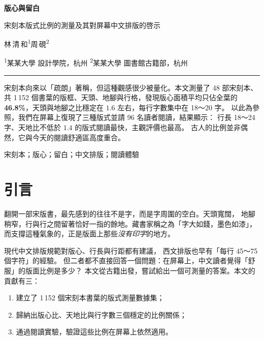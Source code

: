 \documentclass[UTF8,zihao=-4]{ctexart}
\begin{document}
\thispagestyle{empty}
\begin{center}
  {\bfseries 版心與留白\par}
  \vspace{6pt}
  {宋刻本版式比例的測量及其對屏幕中文排版的啓示\par}
  \vspace{14pt}
  {\kaishu 林\,清\,和\textsuperscript{1}\qquad 周\,硯\textsuperscript{2}\par}
  \vspace{4pt}
  {\small\color{mist}
    \textsuperscript{1}某某大學 設計學院，杭州\qquad
    \textsuperscript{2}某某大學 圖書館古籍部，杭州\par}
  \vspace{12pt}
  {\color{accent}\rule{2.5cm}{.6pt}}
\end{center}

\begin{center}
  \begin{minipage}{.9\linewidth}
    \small
    \quad
    宋刻本向來以「疏朗」著稱，但這種觀感很少被量化。本文測量了 48 部宋刻本、
    共 1\,152 個書葉的版框、天頭、地腳與行格，發現版心面積平均只佔全葉的
    \textbf{46.8\%}，天頭與地腳之比穩定在 $1.6$ 左右，每行字數集中在 18～20 字。
    以此為參照，我們在屏幕上復現了三種版式並請 96 名讀者閱讀，結果顯示：
    行長 18～24 字、天地比不低於 $1.4$ 的版式閱讀最快，主觀評價也最高。
    古人的比例並非偶然，它與今天的閱讀舒適區高度重合。

    \vspace{4pt}
    \quad 宋刻本；版心；留白；中文排版；閱讀體驗
  \end{minipage}
\end{center}
\vspace{8pt}

\section{引言}

翻開一部宋版書，最先感到的往往不是字，而是字周圍的空白。天頭寬闊，
地腳稍窄，行與行之間留著恰好一指的餘地。藏書家稱之為「字大如錢，墨色如漆」，
而支撐這種氣象的，正是版面上那些\emph{沒有印字}的地方。

現代中文排版規範對版心、行長與行距都有建議\cite{w3c2020clreq}，
西文排版也早有「每行 45～75 個字符」的經驗\cite{bringhurst2004}。
但二者都不直接回答一個問題：在屏幕上，中文讀者覺得「舒服」的版面比例是多少？
本文從古籍出發，嘗試給出一個可測量的答案。本文的貢獻有三：
\begin{enumerate}
  \item 建立了 1\,152 個宋刻本書葉的版式測量數據集；
  \item 歸納出版心比、天地比與行字數三個穩定的比例關係；
  \item 通過閱讀實驗，驗證這些比例在屏幕上依然適用。
\end{enumerate}
\end{document}
